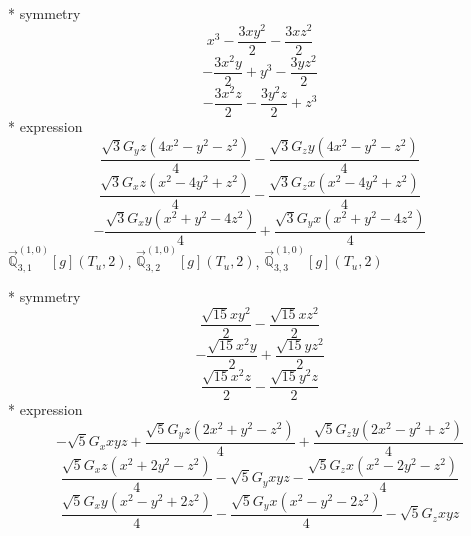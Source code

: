 \documentclass[fleqn,8pt]{jsarticle}
\begin{document}
\noindent\quad ** symmetry
\begin{dmath*}
x^{3} - \frac{3 x y^{2}}{2} - \frac{3 x z^{2}}{2}
\end{dmath*}
\begin{dmath*}
- \frac{3 x^{2} y}{2} + y^{3} - \frac{3 y z^{2}}{2}
\end{dmath*}
\begin{dmath*}
- \frac{3 x^{2} z}{2} - \frac{3 y^{2} z}{2} + z^{3}
\end{dmath*}
\noindent\quad ** expression
\begin{dmath*}
\frac{\sqrt{3} G_{y} z \left(4 x^{2} - y^{2} - z^{2}\right)}{4} - \frac{\sqrt{3} G_{z} y \left(4 x^{2} - y^{2} - z^{2}\right)}{4}
\end{dmath*}
\begin{dmath*}
\frac{\sqrt{3} G_{x} z \left(x^{2} - 4 y^{2} + z^{2}\right)}{4} - \frac{\sqrt{3} G_{z} x \left(x^{2} - 4 y^{2} + z^{2}\right)}{4}
\end{dmath*}
\begin{dmath*}
- \frac{\sqrt{3} G_{x} y \left(x^{2} + y^{2} - 4 z^{2}\right)}{4} + \frac{\sqrt{3} G_{y} x \left(x^{2} + y^{2} - 4 z^{2}\right)}{4}
\end{dmath*}
\noindent\quad $\vec{\mathbb{Q}}_{3,1}^{(1,0)}[g](T_{u},2)$, $\vec{\mathbb{Q}}_{3,2}^{(1,0)}[g](T_{u},2)$, $\vec{\mathbb{Q}}_{3,3}^{(1,0)}[g](T_{u},2)$

\noindent\quad ** symmetry
\begin{dmath*}
\frac{\sqrt{15} x y^{2}}{2} - \frac{\sqrt{15} x z^{2}}{2}
\end{dmath*}
\begin{dmath*}
- \frac{\sqrt{15} x^{2} y}{2} + \frac{\sqrt{15} y z^{2}}{2}
\end{dmath*}
\begin{dmath*}
\frac{\sqrt{15} x^{2} z}{2} - \frac{\sqrt{15} y^{2} z}{2}
\end{dmath*}
\noindent\quad ** expression
\begin{dmath*}
- \sqrt{5} G_{x} x y z + \frac{\sqrt{5} G_{y} z \left(2 x^{2} + y^{2} - z^{2}\right)}{4} + \frac{\sqrt{5} G_{z} y \left(2 x^{2} - y^{2} + z^{2}\right)}{4}
\end{dmath*}
\begin{dmath*}
\frac{\sqrt{5} G_{x} z \left(x^{2} + 2 y^{2} - z^{2}\right)}{4} - \sqrt{5} G_{y} x y z - \frac{\sqrt{5} G_{z} x \left(x^{2} - 2 y^{2} - z^{2}\right)}{4}
\end{dmath*}
\begin{dmath*}
\frac{\sqrt{5} G_{x} y \left(x^{2} - y^{2} + 2 z^{2}\right)}{4} - \frac{\sqrt{5} G_{y} x \left(x^{2} - y^{2} - 2 z^{2}\right)}{4} - \sqrt{5} G_{z} x y z
\end{dmath*}
\end{document}
